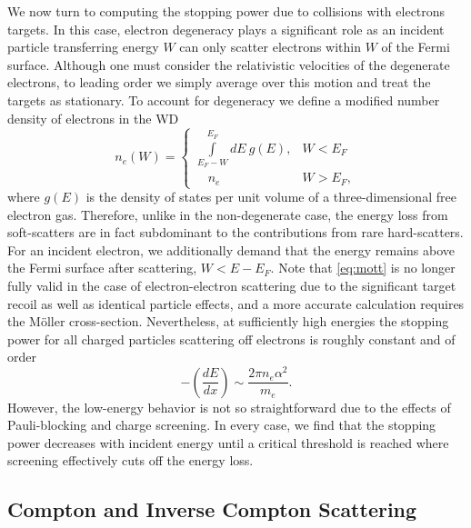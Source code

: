 \documentclass[twocolumn,showpacs,preprintnumbers,amsmath,amssymb,prd]{revtex4}
\def\r{\right)}
\def\l{\left(}
\begin{document}
\begin{appendices}
We now turn to computing the stopping power due to collisions with electrons targets. 
In this case, electron degeneracy plays a significant role as an incident particle transferring energy $W$ can only scatter electrons within $W$ of the Fermi surface.
Although one must consider the relativistic velocities of the degenerate electrons, to leading order we simply average over this motion and treat the targets as stationary. 
To account for degeneracy we define a modified number density of electrons in the WD
\begin{equation}
\label{eq:pauliblocking}
  n_e \l W \r = 
  \begin{cases}
    \displaystyle \int \limits_{E_F - W}^{E_F} dE ~g(E), &  W < E_F  \\
    \quad             n_e                                &  W > E_F,
  \end{cases}
\end{equation}
where $g(E)$ is the density of states per unit volume of a three-dimensional free electron gas.
Therefore, unlike in the non-degenerate case, the energy loss from soft-scatters are in fact subdominant to the contributions from rare hard-scatters.
For an incident electron, we additionally demand that the energy remains above the Fermi surface after scattering, $W < E - E_F$. 
Note that \eqref{eq:mott} is no longer fully valid in the case of electron-electron scattering due to the significant target recoil as well as identical particle effects, and a more accurate calculation requires the M{\"o}ller cross-section.
Nevertheless, at sufficiently high energies the stopping power for all charged particles scattering off electrons is roughly constant and of order
\begin{equation}
-\l \frac{dE}{dx} \r \sim \frac{2 \pi n_e \alpha^2}{m_e}. 
\end{equation}
However, the low-energy behavior is not so straightforward due to the effects of Pauli-blocking and charge screening.
In every case, we find that the stopping power decreases with incident energy until a critical threshold is reached where screening effectively cuts off the energy loss. 
 
 \subsection{Compton and Inverse Compton Scattering}


\end{appendices}
\end{document}
